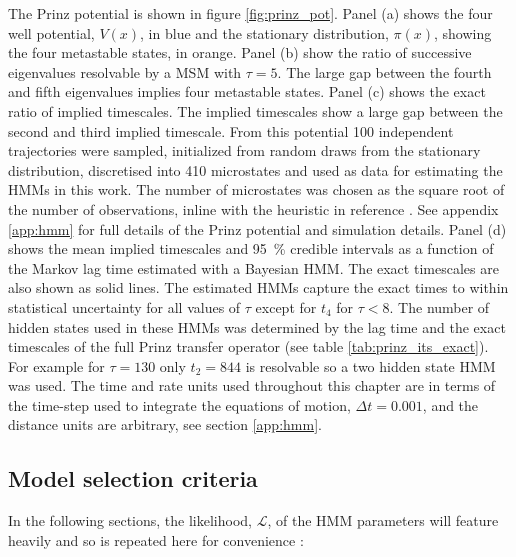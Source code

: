 The Prinz potential \cite{prinzMarkovModelsMolecular2011} is shown in figure \ref{fig:prinz_pot}.  Panel (a) shows the four well potential, $V(x)$, in blue and the stationary distribution, $\pi(x)$, showing the four metastable states, in orange. Panel (b) show the  ratio of successive eigenvalues resolvable by a  MSM with $\tau=5$. The large gap between the fourth and fifth eigenvalues implies four metastable states. Panel (c) shows the exact ratio of implied timescales. The implied timescales show a large gap between the second and third implied timescale. From this potential \num{100} independent trajectories were sampled, initialized from random draws from the stationary distribution, discretised into \num{410} microstates and used as data for estimating the HMMs in this work. The number of microstates was chosen as the square root of the number of observations, inline with the heuristic in reference \cite{husicWardClusteringImproves2017a}. See appendix \ref{app:hmm} for full details of the Prinz potential and simulation details. Panel (d) shows the mean implied timescales and \SI{95}{\percent} credible intervals as a function of the Markov lag time estimated with a Bayesian HMM. The exact timescales are also shown as solid lines. The estimated HMMs capture the exact times to within statistical uncertainty for all values of $\tau$ except for $t_{4}$ for $\tau < 8$. The number of hidden states used in these HMMs was determined by the lag time and the exact timescales of the full Prinz transfer operator (see table \ref{tab:prinz_its_exact}). For example for $\tau = 130$ only $t_2 = 844$ is resolvable so a two hidden state HMM was used. The time and rate units used throughout this chapter are in terms of the time-step used to integrate the equations of motion, $\Delta t = 0.001$, and the distance units are arbitrary, see section \ref{app:hmm}.

\subsection{Model selection criteria}

In the following sections, the likelihood, $\mathcal{L}$, of the HMM parameters will feature heavily and so is repeated here for convenience \cite{noeProjectedHiddenMarkov2013a}: 

